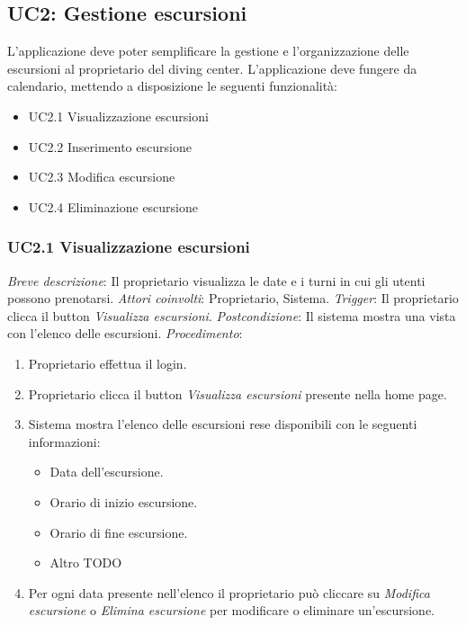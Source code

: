 \subsection{UC2: Gestione escursioni}
L'applicazione deve poter semplificare la gestione e l'organizzazione delle escursioni al proprietario del diving center.
L'applicazione deve fungere da calendario, mettendo a disposizione le seguenti funzionalità:

\begin{itemize}
    \item UC2.1 Visualizzazione escursioni
    \item UC2.2 Inserimento escursione
    \item UC2.3 Modifica escursione
    \item UC2.4 Eliminazione escursione
\end{itemize}

\subsubsection{UC2.1 Visualizzazione escursioni}

\noindent \emph{Breve descrizione}: Il proprietario visualizza le date e i turni in cui gli utenti possono prenotarsi.\medbreak
\noindent \emph{Attori coinvolti}: Proprietario, Sistema.\medbreak
\noindent \emph{Trigger}: Il proprietario clicca il button \textit{Visualizza escursioni}.\medbreak
\noindent \emph{Postcondizione}: Il sistema mostra una vista con l'elenco delle escursioni.\medbreak
\noindent \emph{Procedimento}:

\begin{enumerate}
    \item Proprietario effettua il login.
    \item Proprietario clicca il button \textit{Visualizza escursioni} presente nella home page.
    \item Sistema mostra l'elenco delle escursioni rese disponibili con le seguenti informazioni:
          \begin{itemize}
              \item Data dell'escursione.
              \item Orario di inizio escursione.
              \item Orario di fine escursione.
              \item Altro TODO
          \end{itemize}
    \item Per ogni data presente nell'elenco il proprietario può cliccare su \textit{Modifica escursione} o \textit{Elimina escursione} per modificare o eliminare un'escursione.
\end{enumerate}

